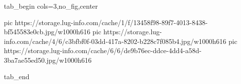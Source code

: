  
 
 
 
 


\ifcmt
  tab_begin cols=3,no_fig,center

     pic https://storage.lug-info.com/cache/1/f/13458f98-89f7-4013-8438-bf545583e0cb.jpg/w1000h616%
		 pic https://storage.lug-info.com/cache/4/6/c3bfbf0f-03dd-417a-8202-b228c7f085b4.jpg/w1000h616%
		 pic https://storage.lug-info.com/cache/6/6/de9b76ec-ddce-4dd4-a58d-3ba7ae55ed50.jpg/w1000h616%

  tab_end
\fi
